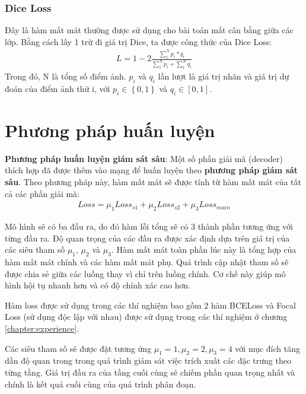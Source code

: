 \subsubsection*{Dice Loss}
Đây là hàm mất mát thường được sử dụng cho bài toán mất cân bằng giữa các lớp. Bằng cách lấy 1 trừ đi giá trị Dice, ta được công thức của Dice Loss:
\begin{align}
    L = 1 - 2\frac{\sum_{1}^{N}p_i*q_i}{\sum_{1}^{N}p_i + \sum_{1}^{N}q_i}
\end{align}
Trong đó, N là tổng số điểm ảnh. $p_i$ và $q_i$ lần lượt là giá trị nhãn và giá trị dự đoán của điểm ảnh thứ i, với $p_i \in \left \{ 0, 1 \right \}$ và $q_i \in \left [ 0, 1 \right ]$.

\section{Phương pháp huấn luyện}
\textbf{Phương pháp huấn luyện giám sát sâu}: Một số phần giải mã (decoder) thích hợp đã được thêm vào mạng để huấn luyện theo \textbf{phương pháp giám sát sâu}. Theo phương pháp này, hàm mất mát sẽ được tính từ hàm mất mát của tất cả các phần giải mã:
\begin{align}
    Loss = \mu_{1}Loss_{s1} + \mu_{2}Loss_{s2} + \mu_{3}Loss_{main}
    \label{LossU2net3D}
\end{align}

Mô hình sẽ có ba đầu ra, do đó hàm lỗi tổng sẽ có 3 thành phần tương ứng với từng đầu ra. Độ quan trọng của các đầu ra được xác định dựa trên giá trị của các siêu tham số $\mu_{1}$, $\mu_{2}$ và $\mu_{3}$. Hàm mất mát toàn phần lúc này là tổng hợp của hàm mất mát chính và các hàm mất mát phụ. Quá trình cập nhật tham số sẽ được chia sẻ giữa các luồng thay vì chỉ trên luồng chính. Cơ chế này giúp mô hình hội tụ nhanh hơn và có độ chính xác cao hơn. 

Hàm loss được sử dụng trong các thí nghiệm bao gồm 2 hàm BCELoss và Focal Loss (sử dụng độc lập với nhau) được sử dụng trong các thí nghiệm ở chương \ref{chapter:experience}.

Các siêu tham số sẽ được đặt tương ứng $\mu_1=1, \mu_2=2,  \mu_3=4$ với mục đích tăng dần độ quan trong trong quá trình giám sát việc trích xuất các đặc trưng theo từng tầng. Giá trị đầu ra của tầng cuối cùng sẽ chiếm phần quan trọng nhất và chính là kết quả cuối cùng của quá trình phân đoạn.
